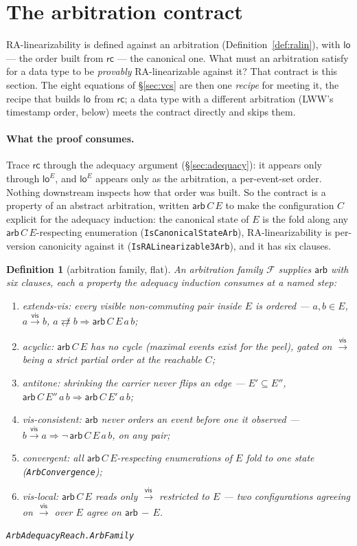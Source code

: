 \documentclass[11pt]{article}
\newtheorem{definition}[theorem]{Definition}
\newcommand{\vis}{\xrightarrow{\mathsf{vis}}}
\newcommand{\rcrel}{\mathsf{rc}}                 %
\newcommand{\ncomm}{\not\rightleftarrows}
\newcommand{\loE}[1]{\mathsf{lo}^{#1}}
\newcommand{\lean}[1]{\texttt{#1}}
\newcommand{\M}[1]{\mathcal{#1}}
\newcommand{\arb}{\mathsf{arb}}
\begin{document}
\section{The arbitration contract}
\label{sec:arb}

RA-linearizability is defined against an arbitration
(Definition~\ref{def:ralin}), with $\loE{}$ --- the order built from
$\rcrel$ --- the canonical one. What must an arbitration satisfy for a data
type to be \emph{provably} RA-linearizable against it? That contract is
this section. The eight equations of \S\ref{sec:vcs} are then one
\emph{recipe} for meeting it, the recipe that builds $\loE{}$ from
$\rcrel$; a data type with a different arbitration (LWW's timestamp order,
below) meets the contract directly and skips them.

\paragraph{What the proof consumes.} Trace $\rcrel$ through the adequacy
argument (\S\ref{sec:adequacy}): it appears only through $\loE{E}$, and
$\loE{E}$ appears only as the arbitration, a per-event-set order. Nothing
downstream inspects how that order was built. So the contract is a property
of an abstract arbitration, written $\arb\,C\,E$ to make the configuration
$C$ explicit for the adequacy induction: the canonical state of $E$ is the
fold along any $\arb\,C\,E$-respecting enumeration
(\lean{IsCanonicalStateArb}), RA-linearizability is per-version canonicity
against it (\lean{IsRALinearizable3Arb}), and it has six clauses.

\begin{definition}[arbitration family, flat]
\label{def:arbfamily}
An arbitration family $\M{F}$ supplies $\arb$ with six clauses, each a
property the adequacy induction consumes at a named step:
\begin{enumerate}[leftmargin=2.4em]
\item \emph{extends-vis}: every visible non-commuting pair inside $E$ is
  ordered --- $a,b \in E$, $a \vis b$, $a \ncomm b \Rightarrow
  \arb\,C\,E\,a\,b$;
\item \emph{acyclic}: $\arb\,C\,E$ has no cycle (maximal events exist for
  the peel), gated on $\vis$ being a strict partial order at the reachable
  $C$;
\item \emph{antitone}: shrinking the carrier never flips an edge ---
  $E' \subseteq E''$, $\arb\,C\,E''\,a\,b \Rightarrow \arb\,C\,E'\,a\,b$;
\item \emph{vis-consistent}: $\arb$ never orders an event before one it
  observed --- $b \vis a \Rightarrow \neg\,\arb\,C\,E\,a\,b$, on any pair;
\item \emph{convergent}: all $\arb\,C\,E$-respecting enumerations of $E$
  fold to one state (\lean{ArbConvergence});
\item \emph{vis-local}: $\arb\,C\,E$ reads only $\vis$ restricted to $E$
  --- two configurations agreeing on $\vis$ over $E$ agree on
  $\arb\,{-}\,E$.
\end{enumerate}
\hfill\lean{ArbAdequacyReach.ArbFamily}
\end{definition}
\end{document}
